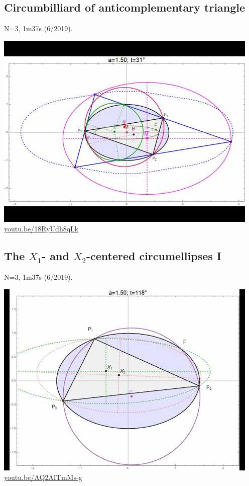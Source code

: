 \documentclass[12pt]{amsart}
\begin{document}
\subsection{Circumbilliard of anticomplementary triangle}
\label{vid:18RyUdh8qLk}
\noindent N=3, 1m37s (6/2019). 
\begin{center}\includegraphics[width=.5\textwidth]{pics/18RyUdh8qLk.jpg} \\ 
\href{https://youtu.be/18RyUdh8qLk}{\url{youtu.be/18RyUdh8qLk}}\end{center}
% 

\subsection{The $X_{1}$- and $X_{2}$-centered circumellipses I}
\label{vid:AQ2AITmMs-g}
\noindent N=3, 1m37s (6/2019). 
\begin{center}\includegraphics[width=.5\textwidth]{pics/AQ2AITmMs-g.jpg} \\ 
\href{https://youtu.be/AQ2AITmMs-g}{\url{youtu.be/AQ2AITmMs-g}}\end{center}
% 
\end{document}
